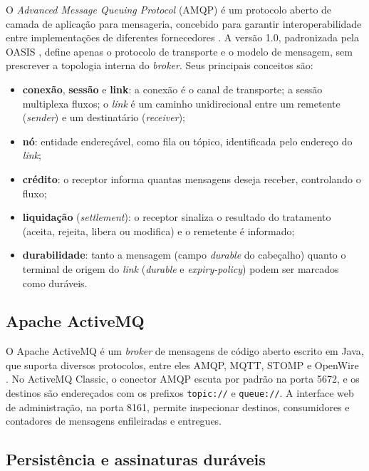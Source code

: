 \documentclass[12pt,a4paper]{article}
\begin{document}
O \textit{Advanced Message Queuing Protocol} (AMQP) é um protocolo aberto de camada de aplicação para mensageria, concebido para garantir interoperabilidade entre implementações de diferentes fornecedores \cite{vinoski2006}. A versão 1.0, padronizada pela OASIS \cite{oasis2012}, define apenas o protocolo de transporte e o modelo de mensagem, sem prescrever a topologia interna do \textit{broker}. Seus principais conceitos são:

\begin{itemize}[nosep]
\item \textbf{conexão}, \textbf{sessão} e \textbf{link}: a conexão é o canal de transporte; a sessão multiplexa fluxos; o \textit{link} é um caminho unidirecional entre um remetente (\textit{sender}) e um destinatário (\textit{receiver});
\item \textbf{nó}: entidade endereçável, como fila ou tópico, identificada pelo endereço do \textit{link};
\item \textbf{crédito}: o receptor informa quantas mensagens deseja receber, controlando o fluxo;
\item \textbf{liquidação} (\textit{settlement}): o receptor sinaliza o resultado do tratamento (aceita, rejeita, libera ou modifica) e o remetente é informado;
\item \textbf{durabilidade}: tanto a mensagem (campo \textit{durable} do cabeçalho) quanto o terminal de origem do \textit{link} (\textit{durable} e \textit{expiry-policy}) podem ser marcados como duráveis.
\end{itemize}

\subsection{Apache ActiveMQ}

O Apache ActiveMQ é um \textit{broker} de mensagens de código aberto escrito em Java, que suporta diversos protocolos, entre eles AMQP, MQTT, STOMP e OpenWire \cite{activemq}. No ActiveMQ Classic, o conector AMQP escuta por padrão na porta 5672, e os destinos são endereçados com os prefixos \texttt{topic://} e \texttt{queue://}. A interface web de administração, na porta 8161, permite inspecionar destinos, consumidores e contadores de mensagens enfileiradas e entregues.

\subsection{Persistência e assinaturas duráveis}
\end{document}
